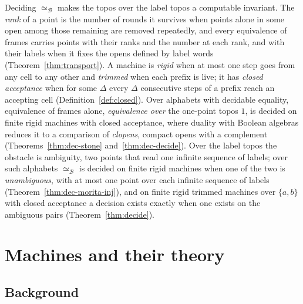 \documentclass{lmcs}
\theoremstyle{definition}
\theoremstyle{remark}
\newcommand{\ab}{\{a,b\}}
\providecommand{\eqB}{\simeq_{\mathcal{B}}}
\begin{document}
Deciding $\eqB$ makes the topos over the label topos a computable invariant. The \emph{rank} of a point is the number
of rounds it survives when points alone in some open among those remaining are removed repeatedly, and every
equivalence of frames carries points with their ranks and the number at each rank, and with their labels when it fixes
the opens defined by label words (Theorem~\ref{thm:transport}). A machine is \emph{rigid} when at most one step goes
from any cell to any other and \emph{trimmed} when each prefix is live; it has \emph{closed acceptance} when for some
$\Delta$ every $\Delta$ consecutive steps of a prefix reach an accepting cell (Definition~\ref{def:closed}). Over
alphabets with decidable equality, equivalence of frames alone, \emph{equivalence over} the one-point topos $1$, is
decided on finite rigid machines with closed acceptance, where duality with Boolean algebras reduces it to a
comparison of \emph{clopens}, compact opens with a complement (Theorems~\ref{thm:dec-stone} and~\ref{thm:dec-decide}).
Over the label topos the obstacle is ambiguity, two points that read one infinite sequence of labels; over such
alphabets $\eqB$ is decided on finite rigid machines when one of the two is \emph{unambiguous}, with at most one point over each infinite sequence of labels
(Theorem~\ref{thm:dec-morita-inj}), and on finite rigid trimmed machines over $\ab$ with closed acceptance a decision
exists exactly when one exists on the ambiguous pairs (Theorem~\ref{thm:decide}).
\section{Machines and their theory}\label{sec:setup}

\subsection*{Background}
\end{document}
